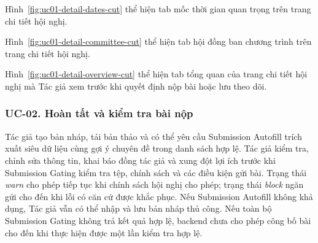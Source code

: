 

Hình~\ref{fig:uc01-detail-dates-cut} thể hiện tab mốc thời gian quan trọng trên trang chi tiết hội nghị.


Hình~\ref{fig:uc01-detail-committee-cut} thể hiện tab hội đồng ban chương trình trên trang chi tiết hội nghị.


Hình~\ref{fig:uc01-detail-overview-cut} thể hiện tab tổng quan của trang chi tiết hội nghị mà Tác giả xem trước khi quyết định nộp bài hoặc lưu theo dõi.

\subsubsection{UC-02. Hoàn tất và kiểm tra bài nộp}

Tác giả tạo bản nháp, tải bản thảo và có thể yêu cầu Submission Autofill trích xuất siêu dữ liệu cùng gợi ý chuyên đề trong danh sách hợp lệ. Tác giả kiểm tra, chỉnh sửa thông tin, khai báo đồng tác giả và xung đột lợi ích trước khi Submission Gating kiểm tra tệp, chính sách và các điều kiện gửi bài. Trạng thái \textit{warn} cho phép tiếp tục khi chính sách hội nghị cho phép; trạng thái \textit{block} ngăn gửi cho đến khi lỗi có căn cứ được khắc phục. Nếu Submission Autofill không khả dụng, Tác giả vẫn có thể nhập và lưu bản nháp thủ công. Nếu toàn bộ Submission Gating không trả kết quả hợp lệ, backend chưa cho phép công bố bài cho đến khi thực hiện được một lần kiểm tra hợp lệ.

